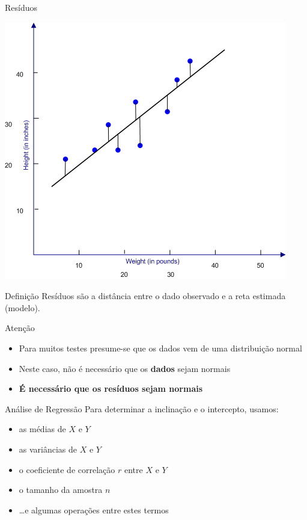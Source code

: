 \documentclass{beamer}
\begin{document}
\begin{frame}{Resíduos}
  \begin{center}
      \includegraphics[height=0.6\textheight]{Cap18-19/residuos}
  \end{center}

  \begin{block}{Definição}
    Resíduos são a distância entre o dado observado e a reta estimada
    (modelo).
  \end{block}
\end{frame}

\begin{frame}{Atenção}
  \begin{itemize}
  \item Para muitos testes presume-se que os dados vem de uma distribuição normal
  \item Neste caso, não é necessário que os {\bf dados} sejam normais
  \item {\bf É necessário que os resíduos sejam normais}
  \end{itemize}
\end{frame}

\begin{frame}{Análise de Regressão}
  Para determinar a inclinação e o intercepto, usamos:
  \begin{itemize}
  \item as médias de $X$ e $Y$
  \item as variâncias de $X$ e $Y$
  \item o coeficiente de correlação $r$ entre $X$ e $Y$
  \item o tamanho da amostra $n$
  \item \ldots e algumas operações entre estes termos
  \end{itemize}
\end{frame}
\end{document}
